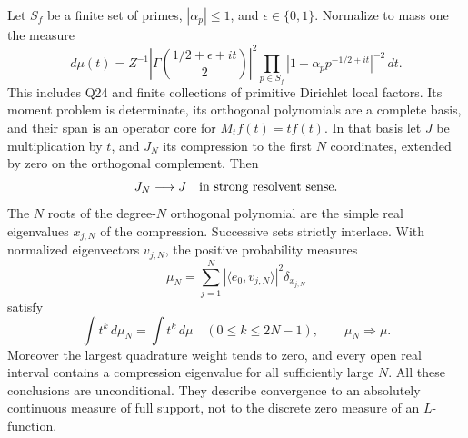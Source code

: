 \begin{theorem}
\label{AC-S14}
Let \(S_f\) be a finite set of primes, \(|\alpha_p|\leq1\), and
\(\epsilon\in\{0,1\}\).  Normalize to mass one the measure
\[
 d\mu(t)=Z^{-1}
 \left|\Gamma\!\left(\frac{1/2+\epsilon+it}{2}\right)\right|^2
 \prod_{p\in S_f}|1-\alpha_pp^{-1/2+it}|^{-2}\,dt.
\]
This includes Q24 and finite collections of primitive Dirichlet local
factors.  Its moment problem is determinate, its orthogonal polynomials
are a complete basis, and their span is an operator core for
\(M_tf(t)=tf(t)\).  In that basis let \(J\) be multiplication by
\(t\), and \(J_N\) its compression to the first \(N\) coordinates,
extended by zero on the orthogonal complement.  Then
\[
 J_N\longrightarrow J\quad\hbox{in strong resolvent sense}.
\]
The \(N\) roots of the degree-\(N\) orthogonal polynomial are the
simple real eigenvalues \(x_{j,N}\) of the compression.  Successive
sets strictly interlace.  With normalized eigenvectors \(v_{j,N}\),
the positive probability measures
\[
 \mu_N=\sum_{j=1}^N|\langle e_0,v_{j,N}\rangle|^2\delta_{x_{j,N}}
\]
satisfy
\[
 \int t^k\,d\mu_N=\int t^k\,d\mu\quad(0\leq k\leq2N-1),
 \qquad \mu_N\Rightarrow\mu.
\]
Moreover the largest quadrature weight tends to zero, and every open
real interval contains a compression eigenvalue for all sufficiently
large \(N\).  All these conclusions are unconditional.  They describe
convergence to an absolutely continuous measure of full support, not
to the discrete zero measure of an \(L\)-function.
\end{theorem}
